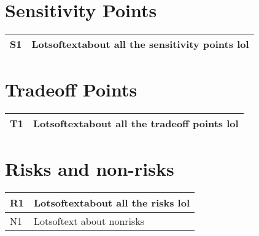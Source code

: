 \section{Sensitivity Points}
\begin{tabular}{|m{}|m{}|}
  \hline
  S1 & Lotsoftextabout all the sensitivity points lol \\ \hline
\end{tabular}

\section{Tradeoff Points}
\begin{tabular}{|m{}|m{}|}
  \hline
  T1 & Lotsoftextabout all the tradeoff points lol \\ \hline
\end{tabular}

\section{Risks and non-risks}
\begin{tabular}{|m{}|m{}|}
  \hline
  R1 & Lotsoftextabout all the risks lol \\ \hline
  N1 & Lotsoftext about nonrisks \\ \hline
\end{tabular}
